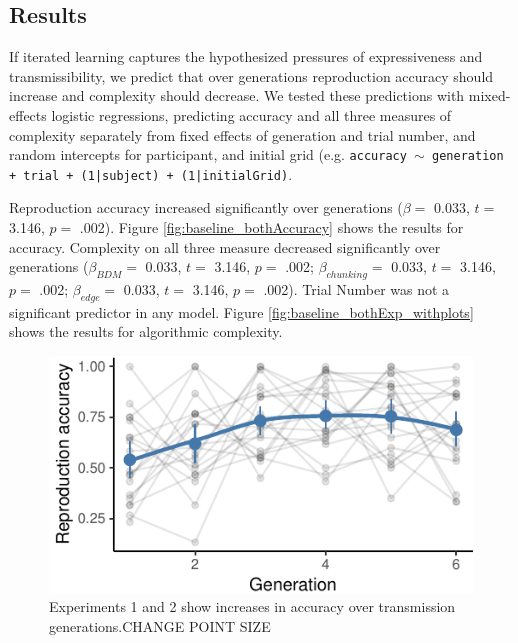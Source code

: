 \documentclass[10pt, letterpaper]{article}
\newenvironment{CodeChunk}{}{}
\begin{document}
\hypertarget{results}{%
\subsection{Results}\label{results}}

If iterated learning captures the hypothesized pressures of
expressiveness and transmissibility, we predict that over generations
reproduction accuracy should increase and complexity should decrease. We
tested these predictions with mixed-effects logistic regressions,
predicting accuracy and all three measures of complexity separately from
fixed effects of generation and trial number, and random intercepts for
participant, and initial grid (e.g.
\texttt{accuracy $\sim$ generation + trial +  (1|subject) + (1|initialGrid)}.

Reproduction accuracy increased significantly over generations
(\(\beta =\) 0.033, \(t =\) 3.146, \(p =\) .002). Figure
\ref{fig:baseline_bothAccuracy} shows the results for accuracy.
Complexity on all three measure decreased significantly over generations
(\(\beta_{BDM} =\) 0.033, \(t =\) 3.146, \(p =\) .002;
\(\beta_{chunking} =\) 0.033, \(t =\) 3.146, \(p =\) .002;
\(\beta_{edge} =\) 0.033, \(t =\) 3.146, \(p =\) .002). Trial Number was
not a significant predictor in any model. Figure
\ref{fig:baseline_bothExp_withplots} shows the results for algorithmic
complexity.

\begin{CodeChunk}
\begin{figure}[tb]

{\centering \includegraphics{figs/e1_acc_plot-1} 

}

\caption[Experiments 1 and 2 show increases in accuracy over transmission generations.CHANGE POINT SIZE]{Experiments 1 and 2 show increases in accuracy over transmission generations.CHANGE POINT SIZE}\label{fig:e1_acc_plot}
\end{figure}
\end{CodeChunk}
\end{document}
